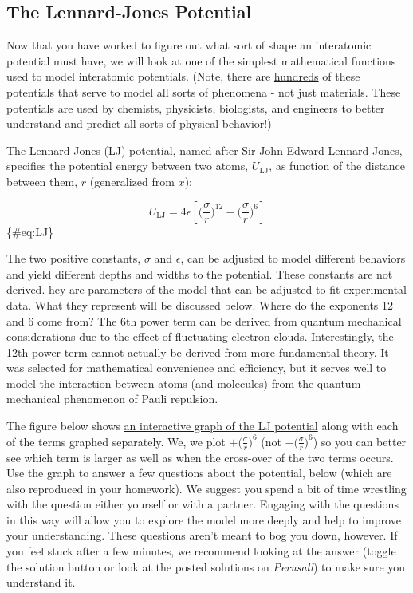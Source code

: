 \documentclass{book}
\begin{document}
\hypertarget{the-lennard-jones-potential}{%
\subsection{The Lennard-Jones Potential}\label{the-lennard-jones-potential}}

Now that you have worked to figure out what sort of shape an interatomic
potential must have, we will look at one of the simplest mathematical
functions used to model interatomic potentials. (Note, there are
\href{https://www.ctcms.nist.gov/potentials/}{hundreds} of these potentials
that serve to model all sorts of phenomena - not just materials. These
potentials are used by chemists, physicists, biologists, and engineers to
better understand and predict all sorts of physical behavior!)

The Lennard-Jones (LJ) potential, named after Sir John Edward Lennard-Jones,
specifies the potential energy between two atoms, \(U_{\text{LJ}}\), as
function of the distance between them, \(r\) (generalized from \(x\)):

\[
U_{\text{LJ}} = 4 \epsilon \left[\Big(\frac{\sigma}{r}\Big)^{12}-\Big(\frac{\sigma}{r}\Big)^6\right]
\]\{\#eq:LJ\}

The two positive constants, \(\sigma\) and \(\epsilon\), can be adjusted to
model different behaviors and yield different depths and widths to the
potential. These constants are not derived. hey are parameters of the model
that can be adjusted to fit experimental data. What they represent will be
discussed below. Where do the exponents 12 and 6 come from? The 6th power term
can be derived from quantum mechanical considerations due to the effect of
fluctuating electron clouds. Interestingly, the 12th power term cannot
actually be derived from more fundamental theory. It was selected for
mathematical convenience and efficiency, but it serves well to model the
interaction between atoms (and molecules) from the quantum mechanical
phenomenon of Pauli repulsion.

The figure below shows \protect\hyperlink{LJPotential}{an interactive graph of
the LJ potential} along with each of the terms graphed separately. We, we plot
\(+\Big(\frac{\sigma}{r}\Big)^6\) (not \(-\Big(\frac{\sigma}{r}\Big)^6\)) so
you can better see which term is larger as well as when the cross-over of the
two terms occurs. Use the graph to answer a few questions about the potential,
below (which are also reproduced in your homework). We suggest you spend a bit
of time wrestling with the question either yourself or with a partner.
Engaging with the questions in this way will allow you to explore the model
more deeply and help to improve your understanding. These questions aren't
meant to bog you down, however. If you feel stuck after a few minutes, we
recommend looking at the answer (toggle the solution button or look at the
posted solutions on \emph{Perusall}) to make sure you understand it.
\end{document}

